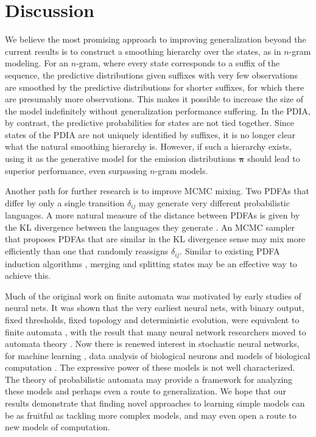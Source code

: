 \section{Discussion}

We believe the most promising approach to improving generalization beyond the current results is to construct a smoothing hierarchy over the states, as in $n$-gram modeling.  For an $n$-gram, where every state corresponds to a suffix of the sequence, the predictive distributions given suffixes with very few observations are smoothed by the predictive distributions for shorter suffixes, for which there are presumably more observations.  This makes it possible to increase the size of the model indefinitely without generalization performance suffering.  In the PDIA, by contrast, the predictive probabilities for states are not tied together.  Since states of the PDIA are not uniquely identified by suffixes, it is no longer clear what the natural smoothing hierarchy is.  However, if such a hierarchy exists, using it as the generative model for the emission distributions $\boldsymbol\pi$ should lead to superior performance, even surpassing $n$-gram models.

Another path for further research is to improve MCMC mixing.  Two PDFAs that differ by only a single transition $\delta_{ij}$ may generate very different probabilistic languages.  A more natural measure of the distance between PDFAs is given by the KL divergence between the languages they generate \cite{Carrasco}.  An MCMC sampler that proposes PDFAs that are similar in the KL divergence sense may mix more efficiently than one that randomly reassigns $\delta_{ij}$.  Similar to existing PDFA induction algorithms \cite{Shalizi,Thollard}, merging and splitting states may be an effective way to achieve this.

Much of the original work on finite automata was motivated by early studies of neural nets.  It was shown that the very earliest neural nets, with binary output, fixed thresholds, fixed topology and deterministic evolution, were equivalent to finite automata \cite{Hopcroft}, with the result that many neural network researchers moved to automata theory \cite{?}.  Now there is renewed interest in stochastic neural networks, for machine learning \cite{Hinton}, data analysis of biological neurons \cite{Paninski} and models of biological computation \cite{Pouget? Lengyel? Fiser?}.  The expressive power of these models is not well characterized.  The theory of probabilistic automata may provide a framework for analyzing these models and perhaps even a route to generalization.  We hope that our results demonstrate that finding novel approaches to learning simple models can be as fruitful as tackling more complex models, and may even open a route to new models of computation.